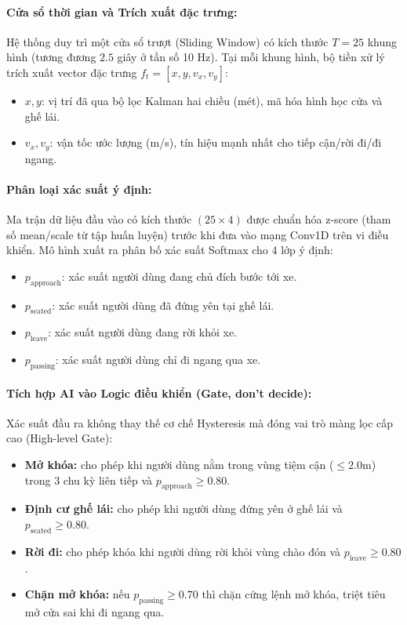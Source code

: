 \paragraph*{Cửa sổ thời gian và Trích xuất đặc trưng:}
Hệ thống duy trì một cửa sổ trượt (Sliding Window) có kích thước $T = 25$ khung hình (tương đương $2.5$ giây ở tần số 10 Hz). Tại mỗi khung hình, bộ tiền xử lý trích xuất vector đặc trưng $f_t = [x, y, v_x, v_y]$:
\begin{itemize}
    \item $x, y$: vị trí đã qua bộ lọc Kalman hai chiều (mét), mã hóa hình học cửa và ghế lái.
    \item $v_x, v_y$: vận tốc ước lượng (m/s), tín hiệu mạnh nhất cho tiếp cận/rời đi/đi ngang.
\end{itemize}

\paragraph*{Phân loại xác suất ý định:}
Ma trận dữ liệu đầu vào có kích thước $(25 \times 4)$ được chuẩn hóa z-score (tham số mean/scale từ tập huấn luyện) trước khi đưa vào mạng Conv1D trên vi điều khiển. Mô hình xuất ra phân bố xác suất Softmax cho 4 lớp ý định:
\begin{itemize}
    \item $p_{\text{approach}}$: xác suất người dùng đang chủ đích bước tới xe.
    \item $p_{\text{seated}}$: xác suất người dùng đã đứng yên tại ghế lái.
    \item $p_{\text{leave}}$: xác suất người dùng đang rời khỏi xe.
    \item $p_{\text{passing}}$: xác suất người dùng chỉ đi ngang qua xe.
\end{itemize}

\paragraph*{Tích hợp AI vào Logic điều khiển (Gate, don't decide):}
Xác suất đầu ra không thay thế cơ chế Hysteresis mà đóng vai trò màng lọc cấp cao (High-level Gate):
\begin{itemize}
    \item \textbf{Mở khóa:} cho phép khi người dùng nằm trong vùng tiệm cận ($\le 2.0$m) trong 3 chu kỳ liên tiếp và $p_{\text{approach}} \ge 0.80$.
    \item \textbf{Định cư ghế lái:} cho phép khi người dùng đứng yên ở ghế lái và $p_{\text{seated}} \ge 0.80$.
    \item \textbf{Rời đi:} cho phép khóa khi người dùng rời khỏi vùng chào đón và $p_{\text{leave}} \ge 0.80$.
    \item \textbf{Chặn mở khóa:} nếu $p_{\text{passing}} \ge 0.70$ thì chặn cứng lệnh mở khóa, triệt tiêu mở cửa sai khi đi ngang qua.
\end{itemize}

